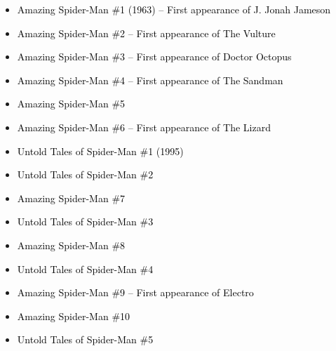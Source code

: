 \documentclass[12pt]{article}
\newcommand{\checkbox}{\raisebox{0.0ex}{\fbox{\rule{0ex}{1.5ex} \rule{1.5ex}{0ex}}}}
\begin{document}
\begin{center}
\begin{tcolorbox}[colback=white!95!gray,
                  colframe=black,
                  width=0.9\textwidth,
                  boxrule=0.8pt,
                  arc=5pt,
                  auto outer arc,
                  left=12pt,
                  right=12pt,
                  top=12pt,
                  bottom=12pt]

\begin{itemize}[left=0pt,label={\checkbox}]
    \item \textcolor{black}{Amazing Spider-Man \#1 (1963) – First appearance of J. Jonah Jameson}
    \item \textcolor{black}{Amazing Spider-Man \#2 – First appearance of The Vulture}
    \item \textcolor{black}{Amazing Spider-Man \#3 – First appearance of Doctor Octopus}
    \item \textcolor{black}{Amazing Spider-Man \#4 – First appearance of The Sandman}
    \item \textcolor{black}{Amazing Spider-Man \#5}
    \item \textcolor{black}{Amazing Spider-Man \#6 – First appearance of The Lizard}
    \item \textcolor{black}{Untold Tales of Spider-Man \#1 (1995)}
    \item \textcolor{black}{Untold Tales of Spider-Man \#2}
    \item \textcolor{black}{Amazing Spider-Man \#7}
    \item \textcolor{black}{Untold Tales of Spider-Man \#3}
    \item \textcolor{black}{Amazing Spider-Man \#8}
    \item \textcolor{black}{Untold Tales of Spider-Man \#4}
    \item \textcolor{black}{Amazing Spider-Man \#9 – First appearance of Electro}
    \item \textcolor{black}{Amazing Spider-Man \#10}
    \item \textcolor{black}{Untold Tales of Spider-Man \#5}
\end{itemize}

\end{tcolorbox}
\end{center}
\end{document}
